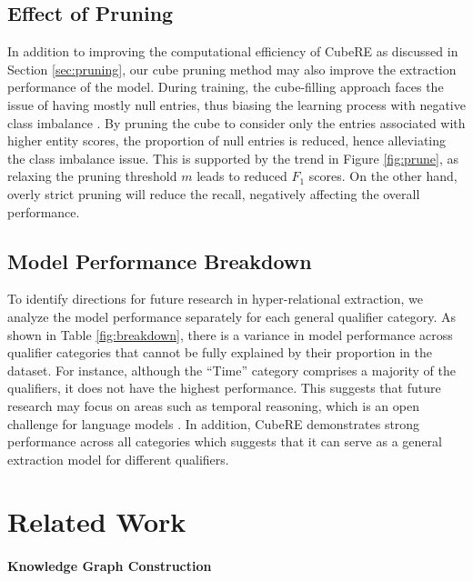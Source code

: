 \documentclass[11pt]{article}
\newcommand{\modelname}{CubeRE}
\begin{document}
\subsection{Effect of Pruning}
\label{sec:pruning_effect}

In addition to improving the computational efficiency of \modelname{} as discussed in Section \ref{sec:pruning}, our cube pruning method may also improve the extraction performance of the model. 
During training, the cube-filling approach faces the issue of having mostly null entries, thus biasing the learning process with negative class imbalance \cite{li-etal-2020-dice}.
By pruning the cube to consider only the entries associated with higher entity scores, the proportion of null entries is reduced, hence alleviating the class imbalance issue. 
This is supported by the trend in Figure \ref{fig:prune}, as relaxing the pruning threshold $m$ leads to reduced $F_1$ scores.
On the other hand, overly strict pruning will reduce the recall, negatively affecting the overall performance.

\subsection{Model Performance Breakdown}
To identify directions for future research in hyper-relational extraction, we analyze the model performance separately for each general qualifier category.
As shown in Table \ref{fig:breakdown}, there is a variance in model performance across qualifier categories that cannot be fully explained by their proportion in the dataset.
For instance, although the ``Time'' category comprises a majority of the qualifiers, it does not have the highest performance.
This suggests that future research may focus on areas such as temporal reasoning, which is an open challenge for language models \citep{vashishtha-etal-2020-temporal, dhingra-etal-2022-time}.
In addition, \modelname{} demonstrates strong performance across all categories which suggests that it can serve as a general extraction model for different qualifiers.

\section{Related Work}

\paragraph{Knowledge Graph Construction}
\end{document}
